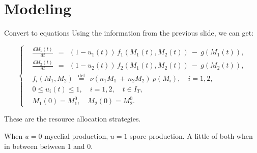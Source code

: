 \documentclass{beamer}
\begin{document}
\section{Modeling}

\begin{frame}{Convert to equations}
    Using the information from the previous slide, we can get:
    
    $$ 
    \left\{ \begin{aligned}
    & \frac{d M_1(t)}{dt} \:\: = \:\: (1 - u_1(t)) \, f_1(M_1(t), M_2(t)) \: - \: g(M_1(t)), \\
    & \frac{d M_2(t)}{dt} \:\: = \:\: (1 - u_2(t)) \, f_2(M_1(t), M_2(t)) \: - \: g(M_2(t)), \\
    & f_i(M_1, M_2) \:\: \stackrel{\mathrm{def}}{=} \:\: \nu(n_1 M_1 \, + \, n_2 M_2) \: \rho(M_i), \quad i = 1,2, \\
    & 0 \leqslant u_i(t) \leqslant 1, \quad i = 1,2, \quad t \in I_T, \\
    & M_1(0) = M_1^0, \quad M_2(0) = M_2^0.
    \end{aligned} \right.
    $$
    
    These are the resource allocation strategies.\newline
    
    When $u = 0$ mycelial production, $u = 1$ spore production.
    A little of both when in between between 1 and 0.
\end{frame}
\end{document}
